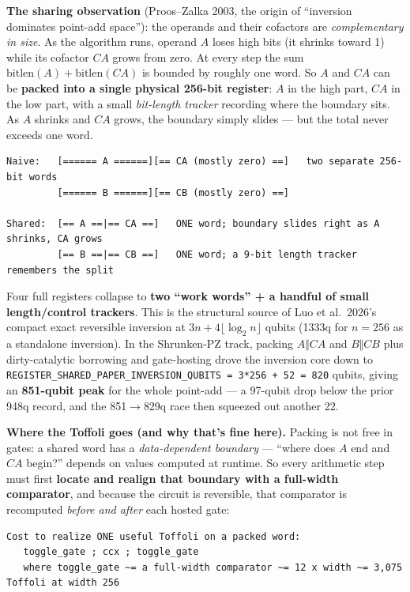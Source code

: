 \documentclass[11pt,a4paper]{article}
\begin{document}
\textbf{The sharing observation} (Proos--Zalka 2003, the origin of ``inversion dominates point-add
space''): the operands and their cofactors are \emph{complementary in size}. As the algorithm runs,
operand $A$ loses high bits (it shrinks toward 1) while its cofactor $CA$ grows from zero. At every
step the sum $\mathrm{bitlen}(A) + \mathrm{bitlen}(CA)$ is bounded by roughly one word. So $A$ and
$CA$ can be \textbf{packed into a single physical 256-bit register}: $A$ in the high part, $CA$ in
the low part, with a small \emph{bit-length tracker} recording where the boundary sits. As $A$
shrinks and $CA$ grows, the boundary simply slides --- but the total never exceeds one word.

\begin{lstlisting}
Naive:   [====== A ======][== CA (mostly zero) ==]   two separate 256-bit words
         [====== B ======][== CB (mostly zero) ==]

Shared:  [== A ==|== CA ==]   ONE word; boundary slides right as A shrinks, CA grows
         [== B ==|== CB ==]   ONE word; a 9-bit length tracker remembers the split
\end{lstlisting}

Four full registers collapse to \textbf{two ``work words'' + a handful of small length/control
trackers}. This is the structural source of Luo et al.\ 2026's compact exact reversible inversion at
$3n + 4\lfloor \log_2 n \rfloor$ qubits (1333q for $n=256$ as a standalone inversion). In the
Shrunken-PZ track, packing $A\Vert CA$ and $B\Vert CB$ plus dirty-catalytic borrowing and
gate-hosting drove the inversion core down to
\lstinline{REGISTER_SHARED_PAPER_INVERSION_QUBITS = 3*256 + 52 = 820} qubits, giving an
\textbf{851-qubit peak} for the whole point-add --- a 97-qubit drop below the prior 948q record, and
the 851$\to$829q race then squeezed out another 22.

\textbf{Where the Toffoli goes (and why that's fine here).} Packing is not free in gates: a shared
word has a \emph{data-dependent boundary} --- ``where does $A$ end and $CA$ begin?'' depends on
values computed at runtime. So every arithmetic step must first \textbf{locate and realign that
boundary with a full-width comparator}, and because the circuit is reversible, that comparator is
recomputed \emph{before and after} each hosted gate:

\begin{lstlisting}
Cost to realize ONE useful Toffoli on a packed word:
   toggle_gate ; ccx ; toggle_gate
   where toggle_gate ~= a full-width comparator ~= 12 x width ~= 3,075 Toffoli at width 256
\end{lstlisting}
\end{document}
